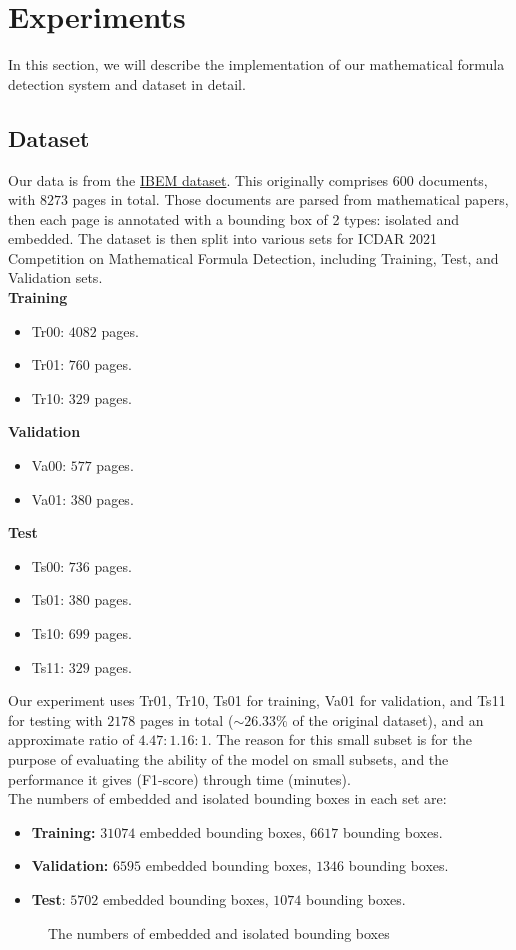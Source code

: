 \section{Experiments}
In this section, we will describe the implementation of our mathematical formula detection system and dataset in detail.
\subsection{Dataset}
Our data is from the \href{https://zenodo.org/record/4757865}{IBEM dataset}. This originally comprises $600$ documents, with $8273$ pages in total. Those documents are parsed from mathematical papers, then each page is annotated with a bounding box of 2 types: isolated and embedded. The dataset is then split into various sets for ICDAR 2021 Competition on Mathematical Formula Detection, including Training, Test, and Validation sets. \\
\textbf{Training}
\begin{itemize}
\item Tr00: $4082$ pages.
\item Tr01: $760$ pages.
\item Tr10: $329$ pages.
\end{itemize}
\textbf{Validation}
\begin{itemize}
\item Va00: $577$ pages.
\item Va01: $380$ pages.
\end{itemize}
\textbf{Test}
\begin{itemize}
\item Ts00: $736$ pages.
\item Ts01: $380$ pages.
\item Ts10: $699$ pages.
\item Ts11: $329$ pages.
\end{itemize}
Our experiment uses Tr01, Tr10, Ts01 for training, Va01 for validation, and Ts11 for testing with $2178$ pages in total ($ \sim 26.33\% $ of the original dataset), and an approximate ratio of $4.47:1.16:1.$ The reason for this small subset is for the purpose of evaluating the ability of the model on small subsets, and the performance it gives (F1-score) through time (minutes).\\
The numbers of embedded and isolated bounding boxes in each set are:
\begin{itemize}
\item \textbf{Training:} $31074$ embedded bounding boxes, $6617$ bounding boxes.
\item \textbf{Validation:} $6595$ embedded bounding boxes, $1346$ bounding boxes.
\item \textbf{Test}: $5702$ embedded bounding boxes, $1074$ bounding boxes.
\end{itemize}
\begin{figure}[H]
\caption{The numbers of embedded and isolated bounding boxes}
\end{figure}

